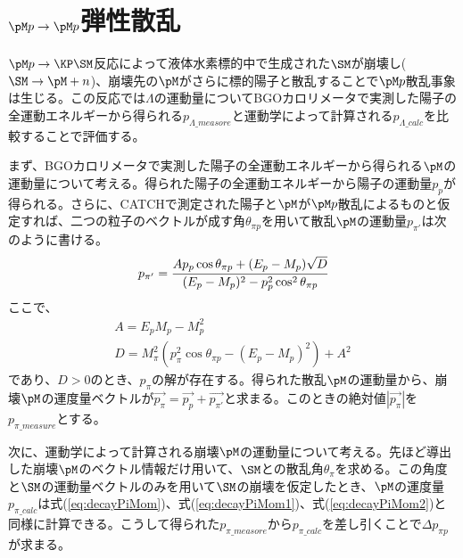 \section{$\pM p\rightarrow \pM p$弾性散乱}
$\pM p\rightarrow \KP\SM$反応によって液体水素標的中で生成された$\SM$が崩壊し($\SM\rightarrow\pM +n$)、崩壊先の$\pM$がさらに標的陽子と散乱することで$\pM p$散乱事象は生じる。この反応では$\Lambda$の運動量についてBGOカロリメータで実測した陽子の全運動エネルギーから得られる$p_{\Lambda\_measore}$と運動学によって計算される$p_{\Lambda\_calc}$を比較することで評価する。\par
まず、BGOカロリメータで実測した陽子の全運動エネルギーから得られる$\pM$の運動量について考える。得られた陽子の全運動エネルギーから陽子の運動量$p_{p}$が得られる。さらに、CATCHで測定された陽子と$\pM$が$\pM p$散乱によるものと仮定すれば、二つの粒子のベクトルが成す角$\theta_{\pi p}$を用いて散乱$\pM$の運動量$p_{\pi '}$は次のように書ける。
\begin{equation}
p_{\pi '} = \cfrac{Ap_{p}\cos\theta_{\pi p}+(E_{p}-M_{p})\sqrt{D}}{(E_{p}-M_{p})^{2}-p^2_{p}\cos^{2}\theta_{\pi p}}
\end{equation}
ここで、
\begin{gather}
A = E_{p}M_{p}-M^2_{p}\\
D = M^2_{\pi}(p^2_{\pi}\cos\theta_{\pi p}-(E_{p}-M_{p})^{2})+A^2
\end{gather}
であり、$D>0$のとき、$p_{\pi}$の解が存在する。得られた散乱$\pM$の運動量から、崩壊$\pM$の運度量ベクトルが$\overrightarrow{p_{\pi}}=\overrightarrow{p_{p}}+\overrightarrow{p_{\pi '}}$と求まる。このときの絶対値$|\overrightarrow{p_{\pi}}|$を$p_{\pi\_measure}$とする。\par
次に、運動学によって計算される崩壊$\pM$の運動量について考える。先ほど導出した崩壊$\pM$のベクトル情報だけ用いて、$\SM$との散乱角$\theta_{\pi}$を求める。この角度と$\SM$の運動量ベクトルのみを用いて$\SM$の崩壊を仮定したとき、$\pM$の運度量$p_{\pi\_calc}$は式(\ref{eq:decayPiMom})、式(\ref{eq:decayPiMom1})、式(\ref{eq:decayPiMom2})と同様に計算できる。こうして得られた$p_{\pi\_measore}$から$p_{\pi\_calc}$を差し引くことで$\Delta p_{\pi p}$が求まる。
